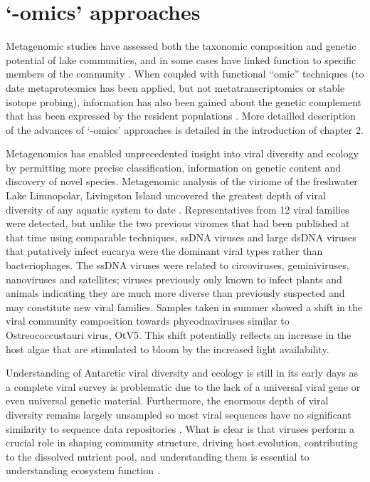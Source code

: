 


\section{`-omics' approaches}
Metagenomic studies have assessed both the taxonomic composition and genetic potential of lake communities, and in some cases have linked function to specific members of the community 
\cite{Lopez-Bueno2009, Ng2010a, Lauro2011, Yau2011, Varin2012}.
When coupled with functional ``omic'' techniques (to date metaproteomics has been applied, but not metatranscriptomics or stable isotope probing), 
information has also been gained about the genetic complement that has been expressed by the resident populations \cite{Ng2010a,Lauro2011}.
More detailled description of the advances of `-omics' approaches is detailed in the introduction of chapter 2.

Metagenomics has enabled unprecedented insight into viral diversity and ecology by permitting more precise classification, information on genetic content and discovery of novel species. 
Metagenomic analysis of the viriome of the freshwater Lake Limnopolar, Livingston Island uncovered the greatest depth of viral diversity of any aquatic system to date \cite{Lopez-Bueno2009}.
Representatives from 12 viral families were detected, but unlike the two previous viromes that had been published at that time using comparable techniques, ss\textsc{DNA} viruses and large ds\textsc{DNA} viruses that putatively infect eucarya were the dominant viral types rather than bacteriophages. 
The ss\textsc{DNA} viruses were related to circoviruses, geminiviruses, nanoviruses and satellites; viruses previously only known to infect plants and animals indicating they are much more diverse than previously suspected and may constitute new viral families. 
Samples taken in summer showed a shift in the viral community composition towards phycodnaviruses similar to Ostreococcustauri virus, OtV5. 
This shift potentially reflects an increase in the host algae that are stimulated to bloom by the increased light availability.

Understanding of Antarctic viral diversity and ecology is still in its early days as a complete viral survey is problematic due to the lack of a universal viral gene or even universal genetic material. 
Furthermore, the enormous depth of viral diversity remains largely unsampled so most viral sequences have no significant similarity to sequence data repositories \cite{Lopez-Bueno2009}. 
What is clear is that viruses perform a crucial role in shaping community structure, driving host evolution, contributing to the dissolved nutrient pool, and understanding them is essential to understanding ecosystem function \cite{Danavoro2011}. 

